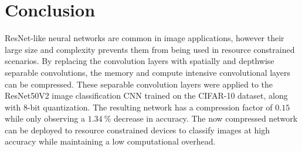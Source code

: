 \documentclass{article}
\begin{document}
	
	\section{Conclusion}
	
	ResNet-like neural networks are common in image applications, however their large size and complexity prevents them from being used in resource constrained scenarios. By replacing the convolution layers with spatially and depthwise separable convolutions, the memory and compute intensive convolutional layers can be compressed. These separable convolution layers were applied to the ResNet50V2 image classification CNN trained on the CIFAR-10 dataset, along with 8-bit quantization. The resulting network has a compression factor of $0.15$ while only observing a $1.34~\%$ decrease in accuracy. The now compressed network can be deployed to resource constrained devices to classify images at high accuracy while maintaining a low computational overhead.
	
	\newpage
	
	
	
\end{document}

